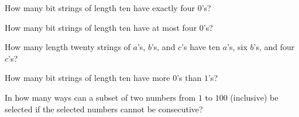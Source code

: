 \begin{prob}
How many bit strings of length ten have exactly four $0$'s?
\end{prob}


\begin{prob}
How many bit strings of length ten have at most four $0$'s?
\end{prob}


\begin{prob}
How many length twenty strings of $a$'s, $b$'s, and $c$'s have ten $a$'s, six $b$'s, and four $c$'s? 
\end{prob}


\begin{prob}
How many bit strings of length ten have more $0$'s than $1$'s?
\end{prob}


\begin{prob}
In how many ways can a subset of two numbers from $1$ to $100$ (inclusive)  be selected if the selected numbers cannot be consecutive? 
\end{prob}


